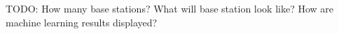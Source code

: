 TODO: How many base stations? What will base station look like? How are machine learning results displayed?